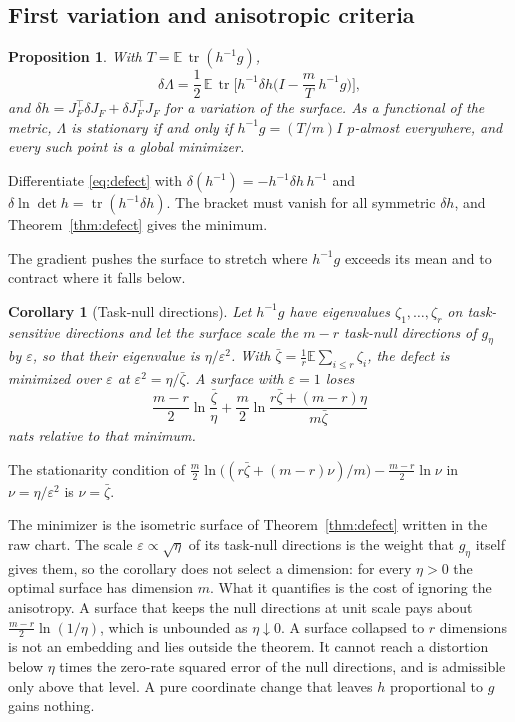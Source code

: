 \documentclass[journal]{IEEEtran}
\newtheorem{proposition}{Proposition}
\newtheorem{corollary}{Corollary}
\newcommand{\E}{\mathbb E}
\DeclareMathOperator{\tr}{tr}
\begin{document}
\subsection{First variation and anisotropic criteria}
\begin{proposition}\label{prop:variation}
With $T=\E\,\tr(h^{-1}g)$,
\begin{equation}
 \delta\Lambda=\frac12\,\E\,\tr\Big[h^{-1}\delta h\Big(I-\frac mT\,h^{-1}g\Big)\Big], \label{eq:dlambda}
\end{equation}
and $\delta h=J_F^\top\delta J_F+\delta J_F^\top J_F$ for a variation of the surface. As a functional of the metric, $\Lambda$ is stationary if and only if $h^{-1}g=(T/m)I$ $p$-almost everywhere, and every such point is a global minimizer.
\end{proposition}
\begin{IEEEproof}
Differentiate \eqref{eq:defect} with $\delta(h^{-1})=-h^{-1}\delta h\,h^{-1}$ and $\delta\ln\det h=\tr(h^{-1}\delta h)$. The bracket must vanish for all symmetric $\delta h$, and Theorem~\ref{thm:defect} gives the minimum.
\end{IEEEproof}
The gradient pushes the surface to stretch where $h^{-1}g$ exceeds its mean and to contract where it falls below.
\begin{corollary}[Task-null directions]\label{cor:dim}
Let $h^{-1}g$ have eigenvalues $\zeta_1,\dots,\zeta_r$ on task-sensitive directions and let the surface scale the $m-r$ task-null directions of $g_\eta$ by $\varepsilon$, so that their eigenvalue is $\eta/\varepsilon^2$. With $\bar\zeta=\frac1r\E\sum_{i\le r}\zeta_i$, the defect is minimized over $\varepsilon$ at $\varepsilon^2=\eta/\bar\zeta$. A surface with $\varepsilon=1$ loses
\begin{equation}
 \frac{m-r}2\ln\frac{\bar\zeta}{\eta}+\frac m2\ln\frac{r\bar\zeta+(m-r)\eta}{m\bar\zeta} \label{eq:dimloss}
\end{equation}
nats relative to that minimum.
\end{corollary}
\begin{IEEEproof}
The stationarity condition of $\frac m2\ln\big((r\bar\zeta+(m-r)\nu)/m\big)-\frac{m-r}2\ln\nu$ in $\nu=\eta/\varepsilon^2$ is $\nu=\bar\zeta$.
\end{IEEEproof}
The minimizer is the isometric surface of Theorem~\ref{thm:defect} written in the raw chart. The scale $\varepsilon\propto\sqrt\eta$ of its task-null directions is the weight that $g_\eta$ itself gives them, so the corollary does not select a dimension: for every $\eta>0$ the optimal surface has dimension $m$. What it quantifies is the cost of ignoring the anisotropy. A surface that keeps the null directions at unit scale pays about $\frac{m-r}2\ln(1/\eta)$, which is unbounded as $\eta\downarrow0$. A surface collapsed to $r$ dimensions is not an embedding and lies outside the theorem. It cannot reach a distortion below $\eta$ times the zero-rate squared error of the null directions, and is admissible only above that level. A pure coordinate change that leaves $h$ proportional to $g$ gains nothing.
\end{document}
